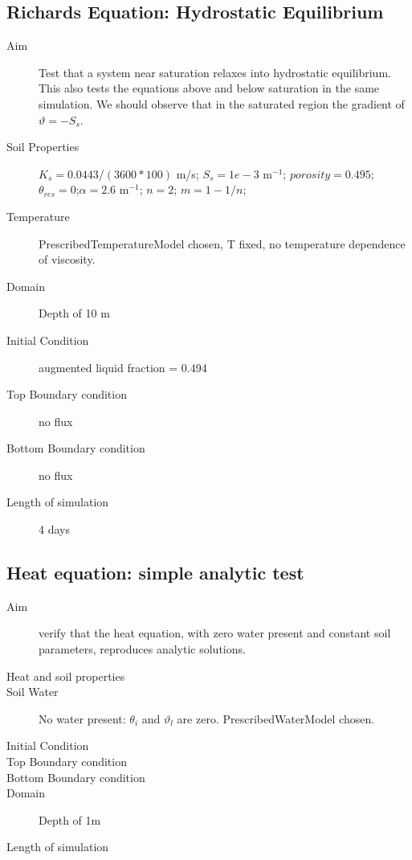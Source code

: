 \documentclass[twoside,10pt]{report}
\begin{document}
\subsection{Richards Equation: Hydrostatic Equilibrium}
\begin{description}
\item [Aim] Test that a system near saturation relaxes into hydrostatic equilibrium. This also tests the equations above and below saturation in the same simulation. We should observe that in the saturated region the gradient of $\vartheta = -S_s$.
\item [Soil Properties] $K_s = 0.0443 / (3600*100)$ m/s; $S_s = 1e-3$ m$^{-1}$; $porosity=0.495$; $\theta_{res}=0$;$\alpha = 2.6$ m$^{-1}$; $n = 2$; $m = 1-1/n$;
\item [Temperature] PrescribedTemperatureModel chosen, T fixed, no temperature dependence of viscosity.
\item [Domain] Depth of 10 m
\item [Initial Condition] augmented liquid fraction = 0.494
\item [Top Boundary condition] no flux
\item [Bottom Boundary condition] no flux
\item [Length of simulation] 4 days
\end{description}

\subsection{Heat equation: simple analytic test}
\begin{description}
\item [Aim]  verify that the heat equation, with zero water present and constant soil parameters, reproduces analytic solutions.
\item [Heat and soil properties]
\item [Soil Water] No water present: $\theta_{i}$ and $\vartheta_l$ are zero. PrescribedWaterModel chosen.
\item [Initial Condition] 
\item [Top Boundary condition] 
\item [Bottom Boundary condition]
\item [Domain] Depth of 1m
\item [Length of simulation]
\end{description}
\end{document}
